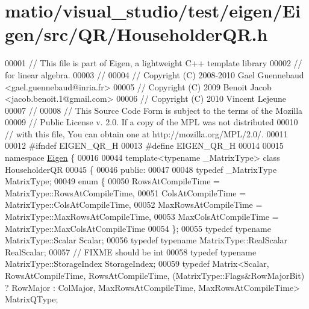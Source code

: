 \hypertarget{matio_2visual__studio_2test_2eigen_2_eigen_2src_2_q_r_2_householder_q_r_8h_source}{}\section{matio/visual\+\_\+studio/test/eigen/\+Eigen/src/\+Q\+R/\+Householder\+QR.h}
\label{matio_2visual__studio_2test_2eigen_2_eigen_2src_2_q_r_2_householder_q_r_8h_source}

\begin{DoxyCode}
00001 \textcolor{comment}{// This file is part of Eigen, a lightweight C++ template library}
00002 \textcolor{comment}{// for linear algebra.}
00003 \textcolor{comment}{//}
00004 \textcolor{comment}{// Copyright (C) 2008-2010 Gael Guennebaud <gael.guennebaud@inria.fr>}
00005 \textcolor{comment}{// Copyright (C) 2009 Benoit Jacob <jacob.benoit.1@gmail.com>}
00006 \textcolor{comment}{// Copyright (C) 2010 Vincent Lejeune}
00007 \textcolor{comment}{//}
00008 \textcolor{comment}{// This Source Code Form is subject to the terms of the Mozilla}
00009 \textcolor{comment}{// Public License v. 2.0. If a copy of the MPL was not distributed}
00010 \textcolor{comment}{// with this file, You can obtain one at http://mozilla.org/MPL/2.0/.}
00011 
00012 \textcolor{preprocessor}{#ifndef EIGEN\_QR\_H}
00013 \textcolor{preprocessor}{#define EIGEN\_QR\_H}
00014 
00015 \textcolor{keyword}{namespace }\hyperlink{namespace_eigen}{Eigen} \{ 
00016 
00044 \textcolor{keyword}{template}<\textcolor{keyword}{typename} \_MatrixType> \textcolor{keyword}{class }HouseholderQR
00045 \{
00046   \textcolor{keyword}{public}:
00047 
00048     \textcolor{keyword}{typedef} \_MatrixType MatrixType;
00049     \textcolor{keyword}{enum} \{
00050       RowsAtCompileTime = MatrixType::RowsAtCompileTime,
00051       ColsAtCompileTime = MatrixType::ColsAtCompileTime,
00052       MaxRowsAtCompileTime = MatrixType::MaxRowsAtCompileTime,
00053       MaxColsAtCompileTime = MatrixType::MaxColsAtCompileTime
00054     \};
00055     \textcolor{keyword}{typedef} \textcolor{keyword}{typename} MatrixType::Scalar Scalar;
00056     \textcolor{keyword}{typedef} \textcolor{keyword}{typename} MatrixType::RealScalar RealScalar;
00057     \textcolor{comment}{// FIXME should be int}
00058     \textcolor{keyword}{typedef} \textcolor{keyword}{typename} MatrixType::StorageIndex StorageIndex;
00059     \textcolor{keyword}{typedef} Matrix<Scalar, RowsAtCompileTime, RowsAtCompileTime, (MatrixType::Flags&RowMajorBit) ? RowMajor
       : ColMajor, MaxRowsAtCompileTime, MaxRowsAtCompileTime> MatrixQType;

\end{DoxyCode}
